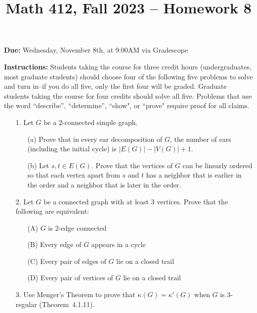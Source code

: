 \documentclass[12pt]{article}
\title{Math 412, Fall 2023 -- Homework 8}
\date{}
\begin{document}
 \maketitle
\vspace{-80pt}

\textbf{Due:} Wednesday, November 8th, at 9:00AM via Gradescope

\textbf{Instructions:} Students taking the course for three credit hours (undergraduates, most graduate
students) should choose four of the following five problems to solve and turn in--if you do all five, only the first four will be graded. Graduate students
taking the course for four credits should solve all five. Problems that use the word ``describe”,
``determine”, ``show", or ``prove" require proof for all claims.

\begin{enumerate}

\item[1.] Let $G$ be a $2$-connected simple graph.

\begin{enumerate}
\item[(a)] Prove that in every ear decomposition of $G$, the number of ears (including the initial cycle) is $|E(G)|-|V(G)|+1$.
    
\item[(b)] Let $s,t\in E(G)$. Prove that the vertices of $G$ can be linearly ordered so that each vertex apart from $s$ and $t$ has a neighbor that is earlier in the order and a neighbor that is later in the order.
 
\end{enumerate}

\item[2.] Let $G$ be a connected graph with at least 3 vertices. Prove that the following are equivalent:

\begin{enumerate}
    \item[(A)] $G$ is 2-edge connected
    \item[(B)] Every edge of $G$ appears in a cycle
    \item[(C)] Every pair of edges of $G$ lie on a closed trail
    \item[(D)] Every pair of vertices of $G$ lie on a closed trail
\end{enumerate}

\item[3.] Use Menger's Theorem to prove that $\kappa(G)=\kappa'(G)$ when $G$ is 3-regular (Theorem~4.1.11).


\end{enumerate}
\end{document}
